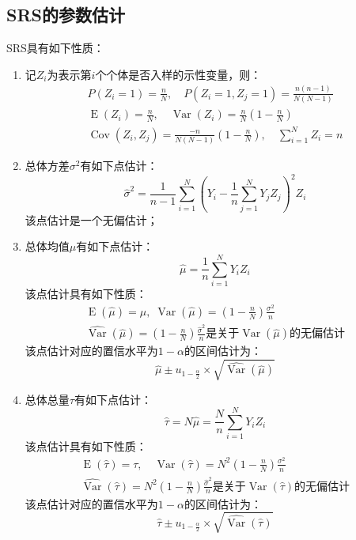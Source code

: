 \subsection{SRS的参数估计}
\begin{property}\label{prop:SRS}
	SRS具有如下性质：
	\begin{enumerate}
		\item 记$Z_i$为表示第$i$个个体是否入样的示性变量，则：
		\begin{gather*}
			P(Z_i=1)=\frac{n}{N},\quad P(Z_i=1,Z_j=1)=\frac{n(n-1)}{N(N-1)} \\
			\operatorname{E}(Z_i)=\frac{n}{N},\quad
			\operatorname{Var}(Z_i)=\frac{n}{N}\left(1-\frac{n}{N}\right) \\
			\operatorname{Cov}(Z_i,Z_j)=\frac{-n}{N(N-1)}\left(1-\frac{n}{N}\right),\quad\sum_{i=1}^{N}Z_i=n
		\end{gather*}
		\item 总体方差$\sigma^2$有如下点估计：
		\begin{equation*}
			\hat{\sigma}^2=\frac{1}{n-1}\sum_{i=1}^N\left(Y_i-\frac{1}{n}\sum_{j=1}^{N}Y_jZ_j\right)^2Z_i
		\end{equation*}
		该点估计是一个无偏估计；
		\item 总体均值$\mu$有如下点估计：
		\begin{equation*}
			\hat{\mu}=\frac{1}{n}\sum\limits_{i=1}^{N}Y_iZ_i
		\end{equation*}
		该点估计具有如下性质：
		\begin{gather*}
			\operatorname{E}(\hat{\mu})=\mu,\;\operatorname{Var}(\hat{\mu})=\left(1-\frac{n}{N}\right)\frac{\sigma^2}{n} \\
			\widehat{\operatorname{Var}}(\hat{\mu})=\left(1-\frac{n}{N}\right)\frac{\hat{\sigma}^2}{n}\text{是关于}\operatorname{Var}(\hat{\mu})\text{的无偏估计}
		\end{gather*}
		该点估计对应的置信水平为$1-\alpha$的区间估计为：
		\begin{equation*}
			\hat{\mu}\pm u_{1-\frac{\alpha}{2}}\times\sqrt{\widehat{\operatorname{Var}}(\hat{\mu})}
		\end{equation*}
		\item 总体总量$\tau$有如下点估计：
		\begin{equation*}
			\hat{\tau}=N\hat{\mu}=\frac{N}{n}\sum\limits_{i=1}^{N}Y_iZ_i
		\end{equation*}
		该点估计具有如下性质：
		\begin{gather*}
			\operatorname{E}(\hat{\tau})=\tau,\quad \operatorname{Var}(\hat{\tau})=N^2\left(1-\frac{n}{N}\right)\frac{\sigma^2}{n} \\
			\widehat{\operatorname{Var}}(\hat{\tau})=N^2\left(1-\frac{n}{N}\right)\frac{\hat{\sigma}^2}{n}\text{是关于}\operatorname{Var}(\hat{\tau})\text{的无偏估计}
		\end{gather*}
		该点估计对应的置信水平为$1-\alpha$的区间估计为：
		\begin{equation*}
			\hat{\tau}\pm u_{1-\frac{\alpha}{2}}\times\sqrt{\widehat{\operatorname{Var}}(\hat{\tau})}
		\end{equation*}
	\end{enumerate}
\end{property}
